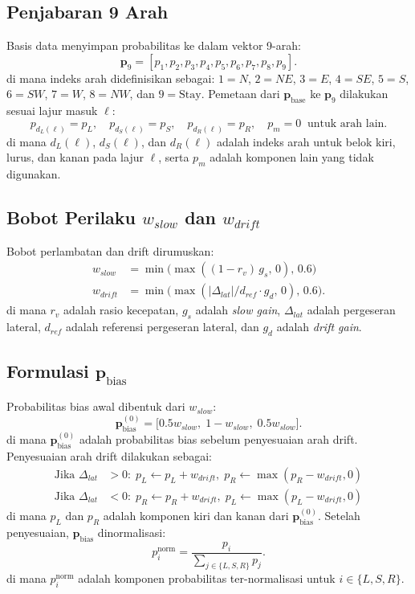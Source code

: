 \documentclass[conference]{IEEEtran}
\begin{document}
\subsection{Penjabaran 9 Arah}
Basis data menyimpan probabilitas ke dalam vektor 9-arah:
\begin{equation}
\mathbf{p}_{9}=[p_1,p_2,p_3,p_4,p_5,p_6,p_7,p_8,p_9].
\end{equation}
di mana indeks arah didefinisikan sebagai: $1=N$, $2=NE$, $3=E$, $4=SE$, $5=S$, $6=SW$, $7=W$, $8=NW$, dan $9=\text{Stay}$.
Pemetaan dari $\mathbf{p}_{\text{base}}$ ke $\mathbf{p}_9$ dilakukan sesuai lajur masuk $\ell$:
\begin{equation}
p_{d_L(\ell)}=p_L,\quad p_{d_S(\ell)}=p_S,\quad p_{d_R(\ell)}=p_R,\quad p_m=0\;\; \text{untuk arah lain}.
\end{equation}
di mana $d_L(\ell)$, $d_S(\ell)$, dan $d_R(\ell)$ adalah indeks arah untuk belok kiri, lurus, dan kanan pada lajur $\ell$, serta $p_m$ adalah komponen lain yang tidak digunakan.

\subsection{Bobot Perilaku $w_{slow}$ dan $w_{drift}$}
Bobot perlambatan dan drift dirumuskan:
\begin{align}
w_{slow} &= \min\big(\max((1-r_v)\,g_s,\,0),\,0.6\big) \\
w_{drift} &= \min\big(\max(|\Delta_{lat}|/d_{ref}\cdot g_d,\,0),\,0.6\big).
\end{align}
di mana $r_v$ adalah rasio kecepatan, $g_s$ adalah \textit{slow gain}, $\Delta_{lat}$ adalah pergeseran lateral, $d_{ref}$ adalah referensi pergeseran lateral, dan $g_d$ adalah \textit{drift gain}.

\subsection{Formulasi $\mathbf{p}_{\text{bias}}$}
Probabilitas bias awal dibentuk dari $w_{slow}$:
\begin{equation}
\mathbf{p}_{\text{bias}}^{(0)}=\big[0.5w_{slow},\;1-w_{slow},\;0.5w_{slow}\big].
\end{equation}
di mana $\mathbf{p}_{\text{bias}}^{(0)}$ adalah probabilitas bias sebelum penyesuaian arah drift.
Penyesuaian arah drift dilakukan sebagai:
\begin{align}
\text{Jika } \Delta_{lat} &> 0:\; p_L \leftarrow p_L + w_{drift},\; p_R \leftarrow \max(p_R-w_{drift},0) \\
\text{Jika } \Delta_{lat} &< 0:\; p_R \leftarrow p_R + w_{drift},\; p_L \leftarrow \max(p_L-w_{drift},0)
\end{align}
di mana $p_L$ dan $p_R$ adalah komponen kiri dan kanan dari $\mathbf{p}_{\text{bias}}^{(0)}$.
Setelah penyesuaian, $\mathbf{p}_{\text{bias}}$ dinormalisasi:
\begin{equation}
p_i^{\text{norm}} = \frac{p_i}{\sum_{j \in \{L,S,R\}} p_j}.
\end{equation}
di mana $p_i^{\text{norm}}$ adalah komponen probabilitas ter-normalisasi untuk $i \in \{L,S,R\}$.
\end{document}
